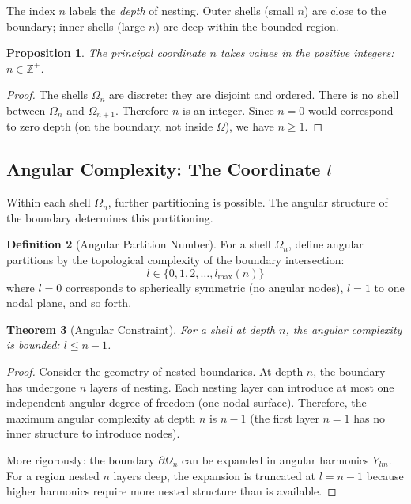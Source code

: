 \documentclass[twocolumn,10pt,a4paper]{article}
\newtheorem{theorem}{Theorem}[section]
\newtheorem{proposition}[theorem]{Proposition}
\theoremstyle{definition}
\newtheorem{definition}[theorem]{Definition}
\theoremstyle{remark}
\begin{document}
The index $n$ labels the \emph{depth} of nesting. Outer shells (small $n$) are close to the boundary; inner shells (large $n$) are deep within the bounded region.

\begin{proposition}
The principal coordinate $n$ takes values in the positive integers: $n \in \mathbb{Z}^+$.
\end{proposition}

\begin{proof}
The shells $\Omega_n$ are discrete: they are disjoint and ordered. There is no shell between $\Omega_n$ and $\Omega_{n+1}$. Therefore $n$ is an integer. Since $n = 0$ would correspond to zero depth (on the boundary, not inside $\Omega$), we have $n \geq 1$.
\end{proof}

\subsection{Angular Complexity: The Coordinate $l$}

Within each shell $\Omega_n$, further partitioning is possible. The angular structure of the boundary determines this partitioning.

\begin{definition}[Angular Partition Number]
For a shell $\Omega_n$, define angular partitions by the topological complexity of the boundary intersection:
\begin{equation}
    l \in \{0, 1, 2, \ldots, l_{\max}(n)\}
\end{equation}
where $l = 0$ corresponds to spherically symmetric (no angular nodes), $l = 1$ to one nodal plane, and so forth.
\end{definition}

\begin{theorem}[Angular Constraint]
\label{thm:angular_constraint}
For a shell at depth $n$, the angular complexity is bounded: $l \leq n - 1$.
\end{theorem}

\begin{proof}
Consider the geometry of nested boundaries. At depth $n$, the boundary has undergone $n$ layers of nesting. Each nesting layer can introduce at most one independent angular degree of freedom (one nodal surface). Therefore, the maximum angular complexity at depth $n$ is $n - 1$ (the first layer $n = 1$ has no inner structure to introduce nodes).

More rigorously: the boundary $\partial\Omega_n$ can be expanded in angular harmonics $Y_{lm}$. For a region nested $n$ layers deep, the expansion is truncated at $l = n - 1$ because higher harmonics require more nested structure than is available.
\end{proof}
\end{document}
